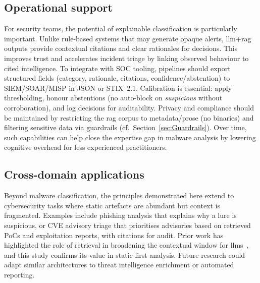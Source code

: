 \subsection{Operational support}\label{subsec:OperationalSupport}
For security teams, the potential of explainable classification is particularly important. Unlike
rule-based systems that may generate opaque alerts, \gls{llm}+\gls{rag} outputs provide contextual
citations and clear rationales for decisions. This improves trust and accelerates incident triage
by linking observed behaviour to cited intelligence. To integrate with SOC tooling, pipelines
should export structured fields (category, rationale, citations, confidence/abstention) to
SIEM/SOAR/MISP in JSON or STIX~2.1. Calibration is essential: apply thresholding, honour
abstentions (no auto-block on \textit{suspicious} without corroboration), and log decisions for
auditability. Privacy and compliance should be maintained by restricting the \gls{rag} corpus to
metadata/prose (no binaries) and filtering sensitive data via guardrails
(cf.~Section~\ref{sec:Guardrails}). Over time, such capabilities can help close the expertise gap
in malware analysis by lowering cognitive overhead for less experienced practitioners.

\subsection{Cross-domain applications}\label{subsec:CrossDomainApplications}
Beyond malware classification, the principles demonstrated here extend to cybersecurity tasks where
static artefacts are abundant but context is fragmented. Examples include phishing analysis that
explains why a lure is suspicious, or CVE advisory triage that prioritises advisories based on
retrieved PoCs and exploitation reports, with citations for audit. Prior work has highlighted the
role of retrieval in broadening the contextual window for \glspl{llm}~\cite{gao2023retrieval,
    lewis2020retrieval}, and this study confirms its value in static-first analysis. Future research
could adapt similar architectures to threat intelligence enrichment or automated reporting.

